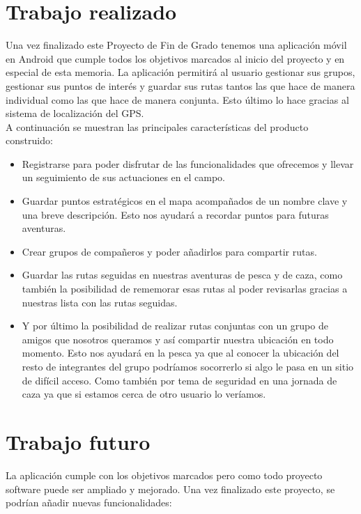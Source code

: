 

\section{Trabajo realizado}
Una vez finalizado este Proyecto de Fin de Grado tenemos una aplicación móvil en Android que cumple todos los objetivos marcados al inicio del proyecto y en especial de esta memoria. La aplicación permitirá al usuario gestionar sus grupos, gestionar sus puntos de interés y guardar sus rutas tantos las que hace de manera individual como las que hace de manera conjunta. Esto último lo hace gracias al sistema de localización del GPS.\\


A continuación se muestran las principales características del producto construido: 

\begin{itemize}
\item Registrarse para poder disfrutar de las funcionalidades que ofrecemos y llevar un seguimiento de sus actuaciones en el campo.
\item Guardar puntos estratégicos en el mapa acompañados de un nombre clave y una breve descripción. Esto nos ayudará a recordar puntos para futuras aventuras. 
\item Crear grupos de compañeros y poder añadirlos para compartir rutas.
\item Guardar las rutas seguidas en nuestras aventuras de pesca y de caza, como también la posibilidad de rememorar esas rutas al poder revisarlas gracias a nuestras lista con las rutas seguidas.
\item Y por último la posibilidad de realizar rutas conjuntas con un grupo de amigos que nosotros queramos y así compartir nuestra ubicación en todo momento. Esto nos ayudará en la pesca ya que al conocer la ubicación del resto de integrantes del grupo podríamos socorrerlo si algo le pasa en un sitio de difícil acceso. Como también por tema de seguridad en una jornada de caza ya que si estamos cerca de otro usuario lo veríamos.
\end{itemize}  

\section{Trabajo futuro}
 La aplicación cumple con los objetivos marcados pero como todo proyecto software puede ser ampliado y mejorado. Una vez finalizado este proyecto, se podrían añadir nuevas funcionalidades:



